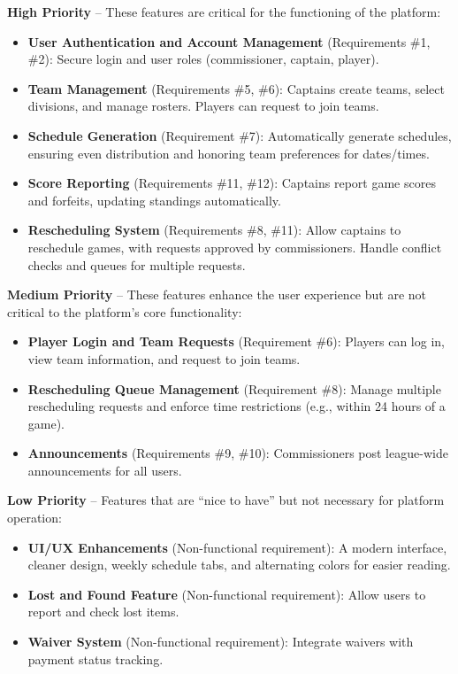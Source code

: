 \documentclass[12pt]{article}
\begin{document}
\textbf{High Priority} – These features are critical for the functioning of the platform:
\begin{itemize}
    \item \textbf{User Authentication and Account Management} (Requirements \#1, \#2): Secure login and user roles (commissioner, captain, player).
    \item \textbf{Team Management} (Requirements \#5, \#6): Captains create teams, select divisions, and manage rosters. Players can request to join teams.
    \item \textbf{Schedule Generation} (Requirement \#7): Automatically generate schedules, ensuring even distribution and honoring team preferences for dates/times.
    \item \textbf{Score Reporting} (Requirements \#11, \#12): Captains report game scores and forfeits, updating standings automatically.
    \item \textbf{Rescheduling System} (Requirements \#8, \#11): Allow captains to reschedule games, with requests approved by commissioners. Handle conflict checks and queues for multiple requests.
\end{itemize}

\textbf{Medium Priority} – These features enhance the user experience but are not critical to the platform’s core functionality:
\begin{itemize}
    \item \textbf{Player Login and Team Requests} (Requirement \#6): Players can log in, view team information, and request to join teams.
    \item \textbf{Rescheduling Queue Management} (Requirement \#8): Manage multiple rescheduling requests and enforce time restrictions (e.g., within 24 hours of a game).
    \item \textbf{Announcements} (Requirements \#9, \#10): Commissioners post league-wide announcements for all users.
\end{itemize}

\textbf{Low Priority} – Features that are “nice to have” but not necessary for platform operation:
\begin{itemize}
    \item \textbf{UI/UX Enhancements} (Non-functional requirement): A modern interface, cleaner design, weekly schedule tabs, and alternating colors for easier reading.
    \item \textbf{Lost and Found Feature} (Non-functional requirement): Allow users to report and check lost items.
    \item \textbf{Waiver System} (Non-functional requirement): Integrate waivers with payment status tracking.
\end{itemize}
\end{document}
